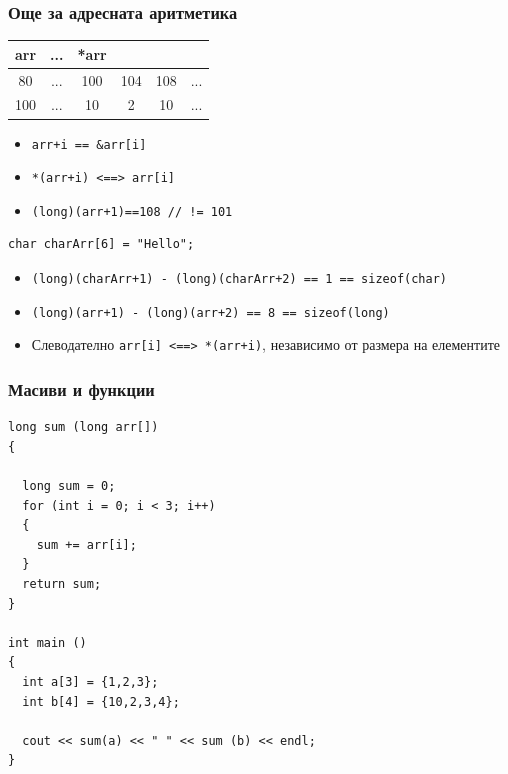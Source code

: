 \documentclass{beamer}
\begin{document}
\begin{frame}[fragile]
\frametitle{Още за адресната аритметика}


\begin{tabular} {c | c | c | c | c | c }

arr &... &*arr \\\hline
80  &... & 100 & 104 & 108 &... \\\hline
100 &... & 10   & 2   & 10   &... \\\hline

\end{tabular}

\vspace{15px}

\begin{itemize}
\item \texttt{arr+i == \&arr[i]}
\pause
\item \texttt{*(arr+i) <==> arr[i]}
\pause
\item \texttt{(long)(arr+1)==108 // != 101}
\end{itemize}

\pause

\begin{flushleft}
\begin{lstlisting}
char charArr[6] = "Hello";
\end{lstlisting}
\end{flushleft}

\begin{itemize}
  \item \texttt{(long)(charArr+1) - (long)(charArr+2) == 1 == sizeof(char)}
  \item \texttt{(long)(arr+1) - (long)(arr+2) == 8 == sizeof(long)}
  \item Слеводателно \texttt{arr[i] <==> *(arr+i)}, независимо от размера на елементите
\end{itemize}


\end{frame}




\begin{frame}[fragile]
\frametitle{Масиви и функции}

\begin{flushleft}
\begin{lstlisting}
long sum (long arr[])
{

  long sum = 0;
  for (int i = 0; i < 3; i++)
  {
    sum += arr[i];
  }
  return sum;
}

int main ()
{
  int a[3] = {1,2,3};
  int b[4] = {10,2,3,4};

  cout << sum(a) << " " << sum (b) << endl;
}

\end{lstlisting}
\end{flushleft}

\end{frame}
\end{document}
